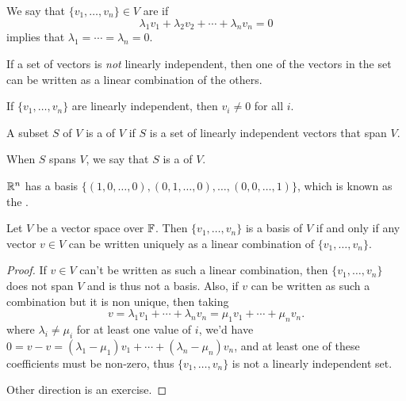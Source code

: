 \documentclass[a4paper]{scrartcl}
\begin{document}
\begin{definition}
We say that $\{v_1, \dots, v_n\} \in V$ are  if
$$
\lambda_1 v_1 + \lambda_2 v_2 + \cdots + \lambda_n v_n = 0
$$
implies that $\lambda_1 = \cdots = \lambda_n = 0$.
\end{definition}

If a set of vectors is \emph{not} linearly independent, then one of the vectors in the set can be written as a linear combination of the others. 

\begin{remark}
    If $\{v_1, \dots, v_n\}$ are linearly independent, then $v_i \neq 0$ for all $i$.
\end{remark}

\begin{definition}[Basis]
    A subset $S$ of $V$ is a  of $V$ if $S$ is a set of linearly independent vectors that span $V$.
\end{definition}

\begin{remark}
    When $S$ spans $V$, we say that $S$ is a  of $V$.
\end{remark}

\begin{example}
    $\mathbb{R}^n$ has a basis $\{(1, 0, \dots, 0), (0, 1, \dots, 0), \dots, (0, 0, \dots, 1)\}$, which is known as the .
\end{example}

\begin{lemma}
    Let $V$ be a vector space over $\mathbb{F}$. Then $\{v_1, \dots, v_n\}$ is a basis of $V$ if and only if any vector $v \in V$ can be written uniquely as a linear combination of $\{v_1, \dots, v_n\}$.
\end{lemma}
\begin{proof}
    If $v \in V$ can't be written as such a linear combination, then $\{v_1, \dots, v_n\}$ does not span $V$ and is thus not a basis. Also, if $v$ can be written as such a combination but it is non unique, then taking 
    $$
v = \lambda_1 v_1 + \cdots + \lambda_n v_n = \mu_1 v_1 + \cdots + \mu_n v_n.
    $$
    where $\lambda_i \neq \mu_i$ for at least one value of $i$, we'd have
    $0 = v - v = (\lambda_1 - \mu_1) v_1 + \cdots + (\lambda_n - \mu_n)v_n$,
    and at least one of these coefficients must be non-zero, thus $\{v_1, \dots, v_n\}$ is not a linearly independent set.

    Other direction is an exercise.
\end{proof}
\end{document}
